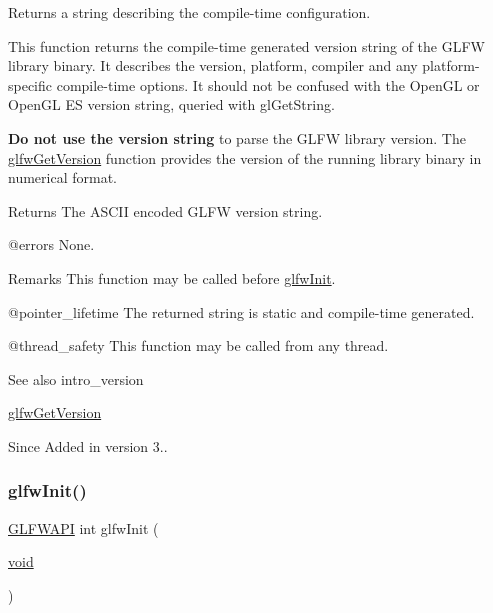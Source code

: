 Returns a string describing the compile-\/time configuration. 

This function returns the compile-\/time generated version string of the G\+L\+FW library binary. It describes the version, platform, compiler and any platform-\/specific compile-\/time options. It should not be confused with the Open\+GL or Open\+GL ES version string, queried with {\ttfamily gl\+Get\+String}.

{\bfseries{Do not use the version string}} to parse the G\+L\+FW library version. The \mbox{\hyperlink{group__init_ga2402c7824ac0194c13722790ff9559ff}{glfw\+Get\+Version}} function provides the version of the running library binary in numerical format.

\begin{DoxyReturn}{Returns}
The A\+S\+C\+II encoded G\+L\+FW version string.
\end{DoxyReturn}
@errors None.

\begin{DoxyRemark}{Remarks}
This function may be called before \mbox{\hyperlink{group__init_gab41771f0215a2e0afb4cf1cf98082d40}{glfw\+Init}}.
\end{DoxyRemark}
@pointer\+\_\+lifetime The returned string is static and compile-\/time generated.

@thread\+\_\+safety This function may be called from any thread.

\begin{DoxySeeAlso}{See also}
intro\+\_\+version 

\mbox{\hyperlink{group__init_ga2402c7824ac0194c13722790ff9559ff}{glfw\+Get\+Version}}
\end{DoxySeeAlso}
\begin{DoxySince}{Since}
Added in version 3.. 
\end{DoxySince}
\mbox{\label{group__init_gab41771f0215a2e0afb4cf1cf98082d40}} 
\subsubsection{\texorpdfstring{glfwInit()}{glfwInit()}}
{\footnotesize\ttfamily \mbox{\hyperlink{glfw3_8h_a56da5036b2cc259351ae22fd6439bb47}{G\+L\+F\+W\+A\+PI}} int glfw\+Init (\begin{DoxyParamCaption}\item[{\mbox{\hyperlink{glad_8h_a950fc91edb4504f62f1c577bf4727c29}{void}}}]{ }\end{DoxyParamCaption})}



